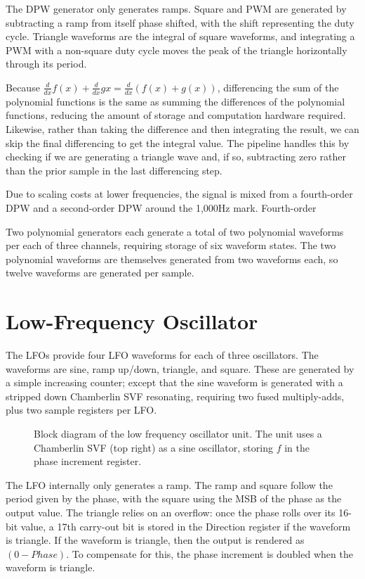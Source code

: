 The DPW generator only generates ramps.  Square and PWM are generated by subtracting a ramp from itself phase shifted, with the shift representing the duty cycle.  Triangle waveforms are the integral of square waveforms, and integrating a PWM with a non-square duty cycle moves the peak of the triangle horizontally through its period.

Because $\frac{d}{dx}f(x)+\frac{d}{dx}g{x}=\frac{d}{dx}(f(x)+g(x))$, differencing the sum of the polynomial functions is the same as summing the differences of the polynomial functions, reducing the amount of storage and computation hardware required.  Likewise, rather than taking the difference and then integrating the result, we can skip the final differencing to get the integral value.  The pipeline handles this by checking if we are generating a triangle wave and, if so, subtracting zero rather than the prior sample in the last differencing step.

Due to scaling costs at lower frequencies, the signal is mixed from a fourth-order DPW and a second-order DPW around the 1,000Hz mark.  Fourth-order

Two polynomial generators each generate a total of two polynomial waveforms per each of three channels, requiring storage of six waveform states.  The two polynomial waveforms are themselves generated from two waveforms each, so twelve waveforms are generated per sample.


\section{Low-Frequency Oscillator}

The LFOs provide four LFO waveforms for each of three oscillators.  The waveforms are sine, ramp up/down, triangle, and square.  These are generated by a simple increasing counter; except that the sine waveform is generated with a stripped down Chamberlin SVF resonating, requiring two fused multiply-adds, plus two sample registers per LFO.

\begin{figure}[ht]
    \centering
    
    \caption{\label{fig:lfo-block-diagram} Block diagram of the low frequency oscillator unit.  The unit uses a Chamberlin SVF (top right) as a sine oscillator, storing $f$ in the phase increment register.}
\end{figure}


The LFO internally only generates a ramp.  The ramp and square follow the period given by the phase, with the square using the MSB of the phase as the output value.  The triangle relies on an overflow:  once the phase rolls over its 16-bit value, a 17th carry-out bit is stored in the Direction register if the waveform is triangle.  If the waveform is triangle, then the output is rendered as $(0-Phase)$.  To compensate for this, the phase increment is doubled when the waveform is triangle.

